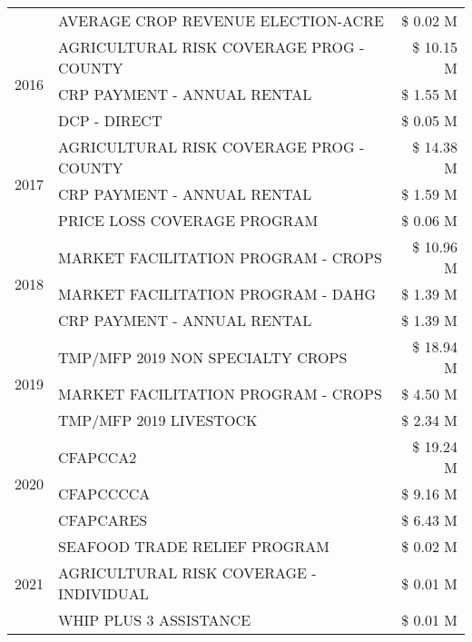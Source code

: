 \begin{tabular}{llr}
 & AVERAGE CROP REVENUE ELECTION-ACRE & \$ 0.02 M \\
\cline{1-3}
\multirow[t]{3}{*}{2016} & AGRICULTURAL RISK COVERAGE PROG - COUNTY & \$ 10.15 M \\
 & CRP PAYMENT - ANNUAL RENTAL & \$ 1.55 M \\
 & DCP - DIRECT & \$ 0.05 M \\
\cline{1-3}
\multirow[t]{3}{*}{2017} & AGRICULTURAL RISK COVERAGE PROG - COUNTY & \$ 14.38 M \\
 & CRP PAYMENT - ANNUAL RENTAL & \$ 1.59 M \\
 & PRICE LOSS COVERAGE PROGRAM & \$ 0.06 M \\
\cline{1-3}
\multirow[t]{3}{*}{2018} & MARKET FACILITATION PROGRAM - CROPS & \$ 10.96 M \\
 & MARKET FACILITATION PROGRAM - DAHG & \$ 1.39 M \\
 & CRP PAYMENT - ANNUAL RENTAL & \$ 1.39 M \\
\cline{1-3}
\multirow[t]{3}{*}{2019} & TMP/MFP 2019 NON SPECIALTY CROPS & \$ 18.94 M \\
 & MARKET FACILITATION PROGRAM - CROPS & \$ 4.50 M \\
 & TMP/MFP 2019 LIVESTOCK & \$ 2.34 M \\
\cline{1-3}
\multirow[t]{3}{*}{2020} & CFAPCCA2 & \$ 19.24 M \\
 & CFAPCCCCA & \$ 9.16 M \\
 & CFAPCARES & \$ 6.43 M \\
\cline{1-3}
\multirow[t]{3}{*}{2021} & SEAFOOD TRADE RELIEF PROGRAM & \$ 0.02 M \\
 & AGRICULTURAL RISK COVERAGE - INDIVIDUAL & \$ 0.01 M \\
 & WHIP PLUS 3 ASSISTANCE & \$ 0.01 M \\
\cline{1-3}
\bottomrule
\end{tabular}
